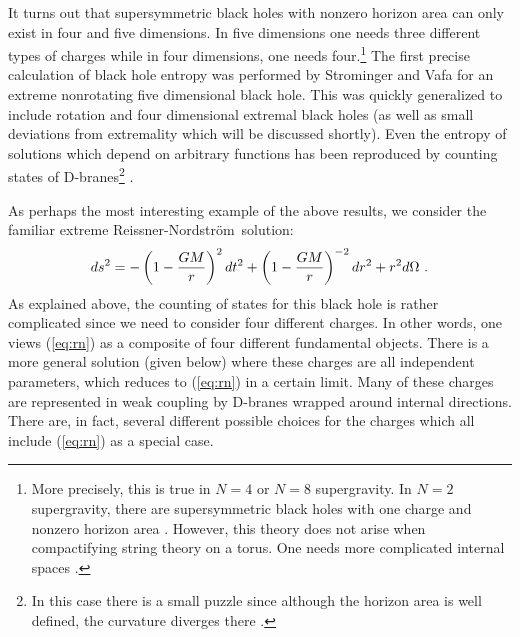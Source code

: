 \documentclass[12pt]{article}
\newcommand{\eq}{\begin{equation}}
\newcommand{\eqe}{\end{equation}}
\newcommand{\e}[1]{\label{eq:#1}}
\newcommand{\ee}[1]{(\ref{eq:#1})}
\newcommand{\RN}{Reissner-Nordstr\"om}
\begin{document}
It turns out that supersymmetric
black holes with nonzero horizon area can only exist in four and five
dimensions. In five dimensions one needs three different types of charges
while in four dimensions, one needs four.\footnote{More precisely, this
is true in $N=4$ or $N=8$ supergravity. In $N=2$ supergravity, there are
supersymmetric black holes with one charge and nonzero horizon area \cite{gihu}.
However, this theory does not arise when compactifying string theory on a
torus. One needs  more complicated internal spaces \cite{n2bh}.}
The first precise calculation of black hole entropy was performed by
Strominger and Vafa \cite{stva} for an extreme
nonrotating five dimensional black hole. 
This was quickly generalized to include rotation \cite{bmpv} and 
four dimensional extremal black holes \cite{mast1,jkm} (as well as
small deviations from extremality which will be discussed shortly). 
Even the entropy of solutions which depend on arbitrary functions
has been reproduced by counting states of D-branes\footnote{In this case there
is
a small puzzle since although the horizon area is well defined,
the curvature diverges there \cite{hoya}.} \cite{homa}.

As perhaps the most interesting example of the above results, we consider
the familiar extreme \RN\  solution:
\eq \e{rn}
ds^2 =-\left( 1 - {GM\over r}\right)^2 dt^2 +
\left( 1 - {GM\over r}\right)^{-2}
dr^2 + r^2 d\Omega\ .
\eqe
As explained above, the counting of states for this black hole
is rather complicated since we need to consider four different charges. 
In other words, one views \ee{rn} as a composite of four different
fundamental objects. There is a more general solution (given below) where these
charges are all independent parameters, which reduces to \ee{rn} in a
certain limit.
Many of these charges are represented in weak coupling by D-branes wrapped
around internal directions. There are, in fact,
several different possible choices for the charges
which all include \ee{rn} as a special case.
\end{document}
